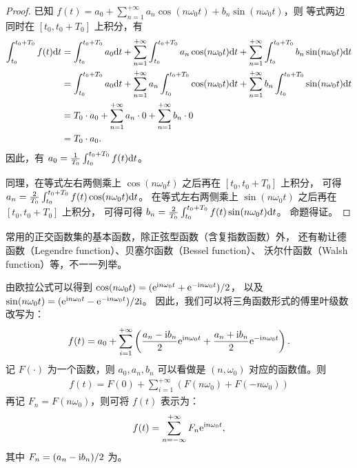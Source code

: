 \begin{proof}
    已知 $f(t) = a_0 + \sum_{n = 1}^{+\infty}a_n\cos(n\omega_0 t) + b_n\sin(n\omega_0 t)$，则
    等式两边同时在 $[t_0, t_0 + T_0]$ 上积分，有
    \begin{align*}
        \int_{t_0}^{t_0 + T_0}f(t)\mathrm{d}t & = \int_{t_0}^{t_0 + T_0}a_0\mathrm{d}t + \sum_{n = 1}^{+\infty}\int_{t_0}^{t_0 + T_0}a_n\cos(n\omega_0 t)\mathrm{d}t + \sum_{n = 1}^{+\infty}\int_{t_0}^{t_0 + T_0}b_n\sin(n\omega_0 t)\mathrm{d}t \\
        & = \int_{t_0}^{t_0 + T_0}a_0\mathrm{d}t + \sum_{n = 1}^{+\infty}a_n\int_{t_0}^{t_0 + T_0}\cos(n\omega_0 t)\mathrm{d}t + \sum_{n = 1}^{+\infty}b_n\int_{t_0}^{t_0 + T_0}\sin(n\omega_0 t)\mathrm{d}t \\
        & = T_0 \cdot a_0 + \sum_{n = 1}^{+\infty}a_n\cdot 0 + \sum_{n = 1}^{+\infty}b_n\cdot 0 \\
        & = T_0 \cdot a_0.
    \end{align*}
    因此，有 $a_0 = \frac{1}{T_0}\int_{t_0}^{t_0 + T_0}f(t)\mathrm{d}t$。

    同理，在等式左右两侧乘上 $\cos(n \omega_0 t)$ 之后再在 $[t_0, t_0 + T_0]$ 上积分，
    可得 $a_n = \frac{2}{T_0}\int_{t_0}^{t_0 + T_0}f(t)\cos(n\omega_0 t)\mathrm{d}t$。
    在等式左右两侧乘上 $\sin(n \omega_0 t)$ 之后再在 $[t_0, t_0 + T_0]$ 上积分，
    可得可得 $b_n = \frac{2}{T_0}\int_{t_0}^{t_0 + T_0}f(t)\sin(n\omega_0 t)\mathrm{d}t$。
    命题得证。
\end{proof}

\begin{remark}
    常用的正交函数集的基本函数，除正弦型函数（含复指数函数）外，
    还有勒让德函数（Legendre function）、贝塞尔函数（Bessel function）、
    沃尔什函数（Walsh function）等，不一一列举。
\end{remark}

\begin{definition}[复指数形式傅里叶级数]
    由欧拉公式可以得到 $\cos(n\omega_0 t) = (\mathrm{e}^{\mathrm{i} n\omega_0 t} + \mathrm{e}^{-\mathrm{i} n\omega_0 t}) / 2$，
    以及 $\sin(n\omega_0 t) = (\mathrm{e}^{\mathrm{i} n\omega_0 t} - \mathrm{e}^{-\mathrm{i} n\omega_0 t}) / 2\mathrm{i}$。
    因此，我们可以将三角函数形式的傅里叶级数改写为：
    \begin{align*}
        f(t) = a_0 + \sum_{i = 1}^{+\infty}\left(\frac{a_n - \mathrm{i} b_n}{2}\mathrm{e}^{\mathrm{i} n\omega_0 t} + \frac{a_n + \mathrm{i} b_n}{2}\mathrm{e}^{-\mathrm{i} n\omega_0 t}\right).
    \end{align*}
    记 $F(\cdot)$ 为一个函数，则 $a_0, a_n, b_n$ 可以看做是 $(n, \omega_0)$ 对应的函数值。则
    \begin{align*}
        f(t) = F(0) + \sum_{i = 1}^{+\infty}\left(F(n\omega_0)+ F(-n\omega_0)\right)
    \end{align*}
    再记 $F_n = F(n\omega_0)$，则可将 $f(t)$ 表示为：
    \begin{align*}
        f(t) = \sum_{n = -\infty}^{+\infty}F_n\mathrm{e}^{\mathrm{i} n\omega_0 t},
    \end{align*}
    其中 $F_n = (a_n - \mathrm{i} b_n) / 2$ 为。
\end{definition}


